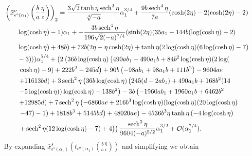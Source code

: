 \begin{equation*}
    \begin{aligned}
        & \left(\bar x_{\epsilon^o(\alpha_1)}^o\left(\frac{b}{a}\frac{\eta}{\epsilon}\right)\right)_2 
        = \frac{3 \sqrt{2} \tanh \eta \operatorname{sech}^2\eta}{\sqrt[4]{-a}} \alpha_1^{3/4} + \frac{9 b \operatorname{sech}^4\eta }{7 a}(\cosh (2 \eta)-2 (\cosh (2 \eta)-2) \\
        &\qquad \log (\cosh \eta)-1) \alpha_1 + -\frac{3 b \operatorname{sech}^4\eta}{196 \sqrt{2} (-a) ^{7/4}} (\sinh (2 \eta) (35 a_1-144 b (\log(\cosh \eta)-2) \\
        &\qquad \log (\cosh \eta)+48 b)+72 b (2 \eta-\eta \cosh (2 \eta)+\tanh \eta (2 \log (\cosh \eta) (6 \log (\cosh \eta)-7)\\
        &\qquad -3))) \alpha_1^{5/4} +\left(2 \left(36 b \log (\cosh \eta)  \left(490 a b_1-490 a_1 b+84 b^2 \log (\cosh \eta) (2 \log ( \right. \right. \right. \\
        &\qquad \left. \left. \cosh \eta)-9)+222 b^2-245 d\right)+90 b \left(-98 a b_1+98 a_1 b+111 b^2\right)-9604 a e \right. \\
        &\qquad \left. +11613 b d\right) + 3 \operatorname{sech}^2\eta \left(36 b \log (\cosh \eta) \left(245 (d-2 a b_1)+490 a_1 b+168 b^2 (14 \right. \right. \\
        &\qquad \left. -5 \log (\cosh \eta)) \log (\cosh \eta)-138 b^2\right)-3 b \left(-1960 a b_1+1960 a_1 b +6462 b^2 \right. \\
        &\qquad \left. +12985 d\right)+7 \operatorname{sech}^2\eta \left(-6860 a e+216 b^3 \log (\cosh \eta) (\log (\cosh\eta) (20 \log(\cosh \eta) \right. \\
        &\qquad \left. \left. -47)-1)+1818 b^3+5145 b d\right) + 48020 a e\right)-4536 b^3 \eta \tanh \eta \left(-4 \log (\cosh \eta) \right. \\
        &\qquad \left. \left. + \operatorname{sech}^2\eta (12 \log(\cosh \eta)-7)+4\right)\right) \frac{\operatorname{sech}^2\eta}{9604 (-a)^{5/2}}  \alpha_1^{3/2}
            + \mathcal{O}(\alpha_1^{7/4}).
    \end{aligned}
\end{equation*}
By expanding $\bar
x_{\epsilon^s(\alpha_1)}^s\left(t_{\epsilon^o(\alpha_1)}\left(\frac{b}{a}\frac{\eta}{\epsilon}\right)\right)$
and simplifying we obtain 
